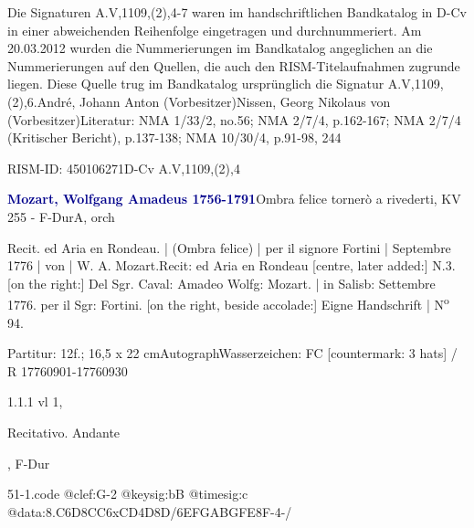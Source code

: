 \documentclass[a4paper, twocolumn, 11pt]{book}
\begin{document}
\newline %
\par Die Signaturen A.V,1109,(2),4-7 waren im handschriftlichen Bandkatalog in D-Cv in einer abweichenden Reihenfolge eingetragen und durchnummeriert. Am 20.03.2012 wurden die Nummerierungen im Bandkatalog angeglichen an die Nummerierungen auf den Quellen, die auch den RISM-Titelaufnahmen zugrunde liegen. Diese Quelle trug im Bandkatalog ursprünglich die Signatur A.V,1109,(2),6.\newline André, Johann Anton  (Vorbesitzer)\newline Nissen, Georg Nikolaus von  (Vorbesitzer)\newline Literatur: NMA  1/33/2, no.56; NMA  2/7/4, p.162-167; NMA  2/7/4 (Kritischer Bericht), p.137-138; NMA  10/30/4, p.91-98, 244
\par RISM-ID: 450106271\newline D-Cv  A.V,1109,(2),4
\par \vspace{16pt} \textcolor{darkblue}{\textbf{Mozart, Wolfgang Amadeus  1756-1791}}\hfillplus{[51]}\newline Ombra felice tornerò a rivederti, KV 255 - F-Dur\newline A, orch
\par \begin{itshape} Recit. ed Aria en Rondeau. | (Ombra felice) | per il signore Fortini | Septembre 1776 | von | W. A. Mozart. Recit: ed Aria en Rondeau [centre, later added:] N.3. [on the right:] Del Sgr. Caval: Amadeo Wolfg: Mozart. | in Salisb: Settembre 1776. per il Sgr: Fortini. [on the right, beside accolade:] Eigne Handschrift | N\textsuperscript{o} 94.\end{itshape} 
\par \textcolor{darkblue}{}  Partitur: 12f.; 16,5 x 22 cm\newline Autograph\newline Wasserzeichen: FC [countermark: 3 hats] / R  17760901-17760930
\par 1.1.1  vl 1, \begin{itshape}Recitativo. Andante\end{itshape}, F-Dur  
\begin{filecontents*}{51-1.code}
@clef:G-2
@keysig:bB
@timesig:c
@data:{8.C6D}{8CC}{6xCD}4D8D/{6EFGA}{BGFE}8F-4-/
\end{filecontents*}
\end{document}

